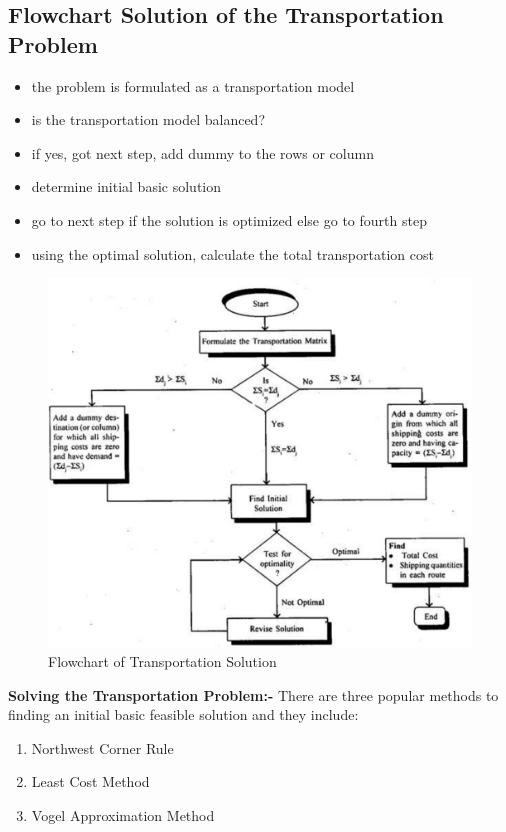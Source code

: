\documentclass[12pt]{report}
\newcommand{\bt}[1]{\textbf{#1}}
\newcommand{\NI}{\noindent}
\newcommand{\tp}{Transportation Problem }
\begin{document}
	\subsection{Flowchart Solution of the \tp}
	\begin{itemize}
		\item the problem is formulated as a transportation model
		\item is the transportation model balanced?
		\item if yes, got next step, add dummy to the rows or column
		\item determine initial basic solution
		\item go to next step if the solution is optimized else go to fourth step
		\item using the optimal solution, calculate the total transportation cost
	\end{itemize}

	\begin{figure}[!h]
		\centering
		\includegraphics[width=0.7\linewidth]{tt5}
		\caption{Flowchart of Transportation Solution}
		\label{fg:3_3}
	\end{figure}

	\NI \bt{Solving the Transportation Problem:-} There are three popular methods to finding an initial basic feasible solution and they include:
	\begin{enumerate}
		\renewcommand{\labelenumi}{(\arabic{enumi})}
		\item Northwest Corner Rule
		\item Least Cost Method
		\item Vogel Approximation Method
	\end{enumerate}
	
\end{document}
